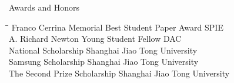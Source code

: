 
\begin{rSection}{Awards and Honors}
\begin{tabbing}
\hspace{3.3in}\= \hspace{3.1in}\= \kill
Franco Cerrina Memorial Best Student Paper Award \> SPIE  \\
A. Richard Newton Young Student Fellow \> DAC  \\
    National Scholarship \> Shanghai Jiao Tong University  \\
    Samsung Scholarship \> Shanghai Jiao Tong University  \\
    The Second Prize Scholarship \> Shanghai Jiao Tong University 
\end{tabbing}
\end{rSection}


